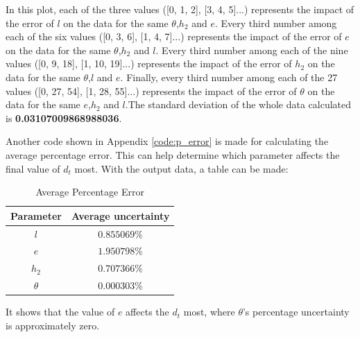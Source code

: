 \documentclass{article}
\begin{document}
    In this plot, each of the three values ([0, 1, 2], [3, 4, 5]...) represents the impact of the error of $l$ on the data for the same $\theta$,$h_2$ and $e$. Every third number among each of the six values ([0, 3, 6], [1, 4, 7]...) represents the impact of the error of $e$ on the data for the same $\theta$,$h_2$ and $l$. Every third number among each of the nine values ([0, 9, 18], [1, 10, 19]...) represents the impact of the error of $h_2$ on the data for the same $\theta$,$l$ and $e$. Finally, every third number among each of the 27 values ([0, 27, 54], [1, 28, 55]...) represents the impact of the error of $\theta$ on the data for the same $e$,$h_2$ and $l$.The standard deviation of the whole data calculated is \textbf{0.03107009868988036}.\par
    Another code shown in Appendix \ref{code:p_error} is made for calculating the average percentage error. This can help determine which parameter affects the final value of $d_t$ most. With the output data, a table can be made:
    
    \begin{table}[H]
        \caption {Average Percentage Error} \label{tb:a_p_e} 
        \begin{center}
            \begin{tabular}{cc}
                \hline
                Parameter & Average uncertainty \\
                \hline
                $l$         & $0.855069\%$     \\
                $e$         & $1.950798\%$     \\
                $h_2$       & $0.707366\%$     \\
                $\theta$    & $0.000303\%$     \\
                \hline
            \end{tabular}
        \end{center}
    \end{table}
    It shows that the value of $e$ affects the $d_t$ most, where $\theta$'s percentage uncertainty is approximately zero. 
\end{document}
